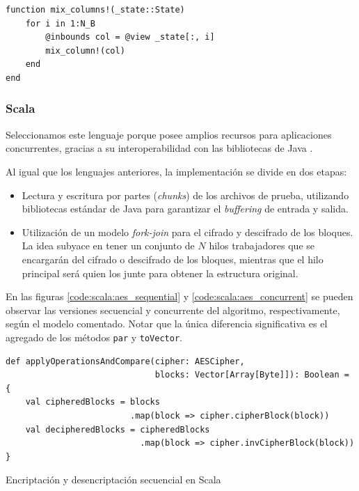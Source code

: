 \documentclass[11pt]{article}
\let\Oldsubsubsection\subsubsection
\renewcommand{\subsubsection}{\FloatBarrier\Oldsubsubsection}
\newcommand{\english}[1]{\textit{#1}}
\begin{document}
\begin{listing}[h]
\begin{verbatim}
function mix_columns!(_state::State)
    for i in 1:N_B
        @inbounds col = @view _state[:, i]
        mix_column!(col)
    end
end
\end{verbatim}
\caption{Implementación de la función \lstinline{mix_columns!} en Julia}
\label{code:julia:aes_mix_columns}
\end{listing}

\subsubsection{Scala}

Seleccionamos este lenguaje porque posee amplios recursos para aplicaciones concurrentes, gracias a su interoperabilidad con las bibliotecas de Java \cite{scala:ex:why_scala_3}.

Al igual que los lenguajes anteriores, la implementación se divide en dos etapas:

\begin{itemize}
    \item Lectura y escritura por partes (\english{chunks}) de los archivos de prueba, utilizando bibliotecas estándar de Java para garantizar el \english{buffering} de entrada y salida.
    \item Utilización de un modelo \english{fork-join} para el cifrado y descifrado de los bloques. La idea subyace en tener un conjunto de $N$ hilos trabajadores que se encargarán del cifrado o descifrado de los bloques, mientras que el hilo principal será quien los junte para obtener la estructura original.
\end{itemize}

En las figuras \ref{code:scala:aes_sequential} y \ref{code:scala:aes_concurrent} se pueden observar las versiones secuencial y concurrente del algoritmo, respectivamente, según el modelo comentado. Notar que la única diferencia significativa es el agregado de los métodos \lstinline{par} y \lstinline{toVector}.

\begin{listing}[h]
\begin{verbatim}
def applyOperationsAndCompare(cipher: AESCipher,
                              blocks: Vector[Array[Byte]]): Boolean = {
    val cipheredBlocks = blocks
                         .map(block => cipher.cipherBlock(block))
    val decipheredBlocks = cipheredBlocks
                           .map(block => cipher.invCipherBlock(block))
}
\end{verbatim}
\caption{Encriptación y desencriptación secuencial en Scala}
\label{code:scala:aes_sequential}
\end{listing}
\end{document}
